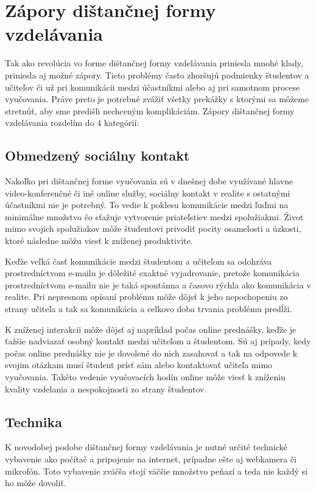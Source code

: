 \documentclass[10pt,twoside,slovak,a4paper]{article}
\begin{document}
\section{Zápory dištančnej formy vzdelávania}
	Tak ako revolúcia vo forme dištančnej formy vzdelávania priniesla mnohé klady, priniesla aj možné zápory. Tieto problémy často zhoršujú podmienky študentov a učiteľov či už pri komunikácii medzi účastníkmi alebo aj pri samotnom procese vyučovania. Práve preto je potrebné zvážiť všetky prekážky s ktorými sa môžeme stretnúť, aby sme predišli nechceným komplikáciám. Zápory dištančnej formy vzdelávania rozdelím do 4 kategórií:

\subsection{Obmedzený sociálny kontakt}
	Nakoľko pri dištančnej forme vyučovania sú v dnešnej dobe využívané hlavne video-konferenčné či iné online služby, sociálny kontakt v realite s ostatnými účastníkmi nie je potrebný. To vedie k poklesu komunikácie medzi ľuďmi na minimálne množstvo čo sťažuje vytvorenie priateľstiev medzi spolužiakmi. Život mimo svojich spolužiakov môže študentovi privodiť pocity osamelosti a úzkosti, ktoré následne môžu viesť k zníženej produktivite. 

	Keďže veľká časť komunikácie medzi študentom a učiteľom sa odohráva prostredníctvom e-mailu je dôležité exaktné vyjadrovanie, pretože komunikácia prostredníctvom e-mailu nie je taká spontánna a časovo rýchla ako komunikácia v realite. Pri nepresnom opísaní problému môže dôjsť k jeho nepochopeniu zo strany učiteľa a tak sa komunikácia a celkovo doba trvania problému predĺži. 

	K zníženej interakcii môže dôjsť aj napríklad počas online prednášky, keďže je ťažšie nadviazať osobný kontakt medzi učiteľom a študentom. Sú aj prípady, kedy počas online prednášky nie je dovolené do nich zasahovať a tak na odpovede k svojim otázkam musí študent prísť sám alebo kontaktovať učiteľa mimo vyučovania. Takéto vedenie vyučovacích hodín online môže viesť k zníženiu kvality vzdelania a nespokojnosti zo strany študentov.

\subsection{Technika}
	K novodobej podobe dištančnej formy vzdelávania je nutné určité technické vybavenie ako počítač a pripojenie na internet, prípadne ešte aj webkamera či mikrofón. Toto vybavenie zväčša stojí väčšie množstvo peňazí a teda nie každý si ho môže dovoliť. 
\end{document}
